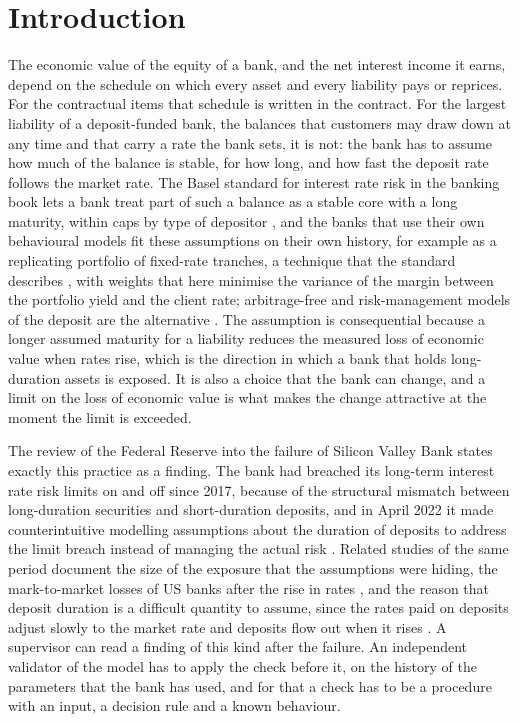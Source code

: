 \section{Introduction}
\label{sec:introduction}

The economic value of the equity of a bank, and the net interest income it earns, depend on the schedule on which every asset and every liability pays or reprices. For the contractual items that schedule is written in the contract. For the largest liability of a deposit-funded bank, the balances that customers may draw down at any time and that carry a rate the bank sets, it is not: the bank has to assume how much of the balance is stable, for how long, and how fast the deposit rate follows the market rate. The Basel standard for interest rate risk in the banking book lets a bank treat part of such a balance as a stable core with a long maturity, within caps by type of depositor \citep{bcbs2016,basel2019srp31}, and the banks that use their own behavioural models fit these assumptions on their own history, for example as a replicating portfolio of fixed-rate tranches, a technique that the standard describes \citep{bcbs2016}, with weights that here minimise the variance of the margin between the portfolio yield and the client rate; arbitrage-free and risk-management models of the deposit are the alternative \citep{jarrow1998,kalkbrener2004}. The assumption is consequential because a longer assumed maturity for a liability reduces the measured loss of economic value when rates rise, which is the direction in which a bank that holds long-duration assets is exposed. It is also a choice that the bank can change, and a limit on the loss of economic value is what makes the change attractive at the moment the limit is exceeded.

The review of the Federal Reserve into the failure of Silicon Valley Bank states exactly this practice as a finding. The bank had breached its long-term interest rate risk limits on and off since 2017, because of the structural mismatch between long-duration securities and short-duration deposits, and in April 2022 it made counterintuitive modelling assumptions about the duration of deposits to address the limit breach instead of managing the actual risk \citep{fed2023}. Related studies of the same period document the size of the exposure that the assumptions were hiding, the mark-to-market losses of US banks after the rise in rates \citep{jiang2024}, and the reason that deposit duration is a difficult quantity to assume, since the rates paid on deposits adjust slowly to the market rate and deposits flow out when it rises \citep{drechsler2017,drechsler2021}. A supervisor can read a finding of this kind after the failure. An independent validator of the model has to apply the check before it, on the history of the parameters that the bank has used, and for that a check has to be a procedure with an input, a decision rule and a known behaviour.

